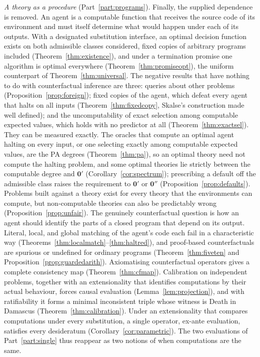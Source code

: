 \emph{A theory as a procedure} (Part~\ref{part:programs}). Finally, the supplied dependence is removed.
An agent is a computable function that receives the source code of its environment and must itself
determine what would happen under each of its outputs. With a designated substitution interface, an
optimal decision function exists on both admissible classes considered, fixed copies of arbitrary programs
included (Theorem~\ref{thm:existence}), and under a termination promise one algorithm is optimal
everywhere (Theorem~\ref{thm:promiseopt}), the uniform counterpart of Theorem~\ref{thm:universal}. The
negative results that have nothing to do with counterfactual inference are three: queries about other
problems (Proposition~\ref{prop:foreign}); fixed copies of the agent, which defeat every agent that
halts on all inputs (Theorem~\ref{thm:fixedcopy}, Skalse's construction made well defined); and the
uncomputability of exact selection among computable expected values, which holds with no predictor at
all (Theorem~\ref{thm:exactsel}). They can be measured exactly. The oracles that compute an optimal
agent halting on every input, or one selecting exactly among computable expected values, are the PA
degrees (Theorem~\ref{thm:pa}), so an optimal theory need not compute the halting problem, and some
optimal theories lie strictly between the computable degree and $\mathbf 0'$
(Corollary~\ref{cor:spectrum}); prescribing a default off the admissible class raises the requirement
to $\mathbf 0'$ or $\mathbf 0''$ (Proposition~\ref{prop:defaults}). Problems built against a theory
exist for every theory that the environments can compute, but non-computable theories can also be
predictably wrong (Proposition~\ref{prop:unfair}). The genuinely counterfactual question is how an agent should identify the
parts of a closed program that depend on its output. Literal, local, and global matching of the agent's
code each fail in a characteristic way (Theorems~\ref{thm:localmatch}--\ref{thm:haltred}), and
proof-based counterfactuals are spurious or undefined for ordinary programs (Theorem~\ref{thm:fiveten}
and Proposition~\ref{prop:guardedarith}). Axiomatising counterfactual operators gives a complete
consistency map (Theorem~\ref{thm:cfmap}). Calibration on independent problems, together with an
extensionality that identifies computations by their actual behaviour, forces causal evaluation
(Lemma~\ref{lem:projection}), and with ratifiability it forms a minimal inconsistent triple whose
witness is Death in Damascus (Theorem~\ref{thm:calibration}). Under an extensionality that compares
computations under every substitution, a single operator, ex-ante evaluation, satisfies every
desideratum (Corollary~\ref{cor:parametric}). The two evaluations of Part~\ref{part:single} thus
reappear as two notions of when computations are the same.

